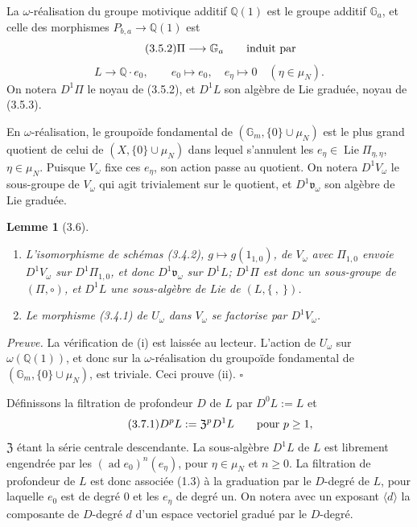 \documentclass[10pt,a4paper]{article}
\newcommand{\Gm}{\mathbb G_m}
\newcommand{\Ga}{\mathbb G_a}
\newcommand{\muN}{\mu_N}
\newcommand{\Q}{\mathbb Q}
\newcommand{\Lie}{\operatorname{Lie}}
\newcommand{\ad}{\operatorname{ad}}
\newcommand{\vomega}{\mathfrak v_\omega}
\newcommand{\Zcen}{\mathfrak Z}
\theoremstyle{deligne}
\newtheorem*{lemma*}{Lemme}
\newenvironment{proofdel}{\textit{Preuve.}}{\hfill$\square$}
\newcommand{\heading}[1]{\vspace{0.65em}\noindent{\bfseries #1}\quad}
\begin{document}
La \(\omega\)-réalisation du groupe motivique additif \(\Q(1)\) est le groupe additif \(\Ga\), et celle des morphismes \(P_{b,a}\to\Q(1)\) est
\[
\tag{3.5.2}
\Pi\longrightarrow\Ga\qquad\hbox{induit par}
\]
\[
\tag{3.5.3}
L\longrightarrow\Q\cdot e_0,\qquad e_0\longmapsto e_0,\quad e_\eta\longmapsto0\quad(\eta\in\muN).
\]
On notera \(D^1\Pi\) le noyau de (3.5.2), et \(D^1L\) son algèbre de Lie graduée, noyau de (3.5.3).

En \(\omega\)-réalisation, le groupoïde fondamental de \((\Gm,\{0\}\cup\muN)\) est le plus grand quotient de celui de \((X,\{0\}\cup\muN)\) dans lequel s'annulent les \(e_\eta\in\Lie\Pi_{\eta,\eta}\), \(\eta\in\muN\). Puisque \(V_\omega\) fixe ces \(e_\eta\), son action passe au quotient. On notera \(D^1V_\omega\) le sous-groupe de \(V_\omega\) qui agit trivialement sur le quotient, et \(D^1\vomega\) son algèbre de Lie graduée.

\begin{lemma*}[3.6]
\begin{enumerate}[label=(\roman*)]
\item L'isomorphisme de schémas (3.4.2), \(g\mapsto g(1_{1,0})\), de \(V_\omega\) avec \(\Pi_{1,0}\) envoie \(D^1V_\omega\) sur \(D^1\Pi_{1,0}\), et donc \(D^1\vomega\) sur \(D^1L\); \(D^1\Pi\) est donc un sous-groupe de \((\Pi,\circ)\), et \(D^1L\) une sous-algèbre de Lie de \((L,\{\ ,\ \})\).
\item Le morphisme (3.4.1) de \(U_\omega\) dans \(V_\omega\) se factorise par \(D^1V_\omega\).
\end{enumerate}
\end{lemma*}

\begin{proofdel}
La vérification de (i) est laissée au lecteur. L'action de \(U_\omega\) sur \(\omega(\Q(1))\), et donc sur la \(\omega\)-réalisation du groupoïde fondamental de \((\Gm,\{0\}\cup\muN)\), est triviale. Ceci prouve (ii).
\end{proofdel}

\heading{3.7.} Définissons la filtration de profondeur \(D\) de \(L\) par \(D^0L:=L\) et
\[
\tag{3.7.1}
D^pL:=\Zcen^pD^1L\qquad\hbox{pour }p\ge1,
\]
\(\Zcen\) étant la série centrale descendante. La sous-algèbre \(D^1L\) de \(L\) est librement engendrée par les \((\ad e_0)^n(e_\eta)\), pour \(\eta\in\muN\) et \(n\ge0\). La filtration de profondeur de \(L\) est donc associée (1.3) à la graduation par le \(D\)-degré de \(L\), pour laquelle \(e_0\) est de degré \(0\) et les \(e_\eta\) de degré un. On notera avec un exposant \(\langle d\rangle\) la composante de \(D\)-degré \(d\) d'un espace vectoriel gradué par le \(D\)-degré.
\end{document}
